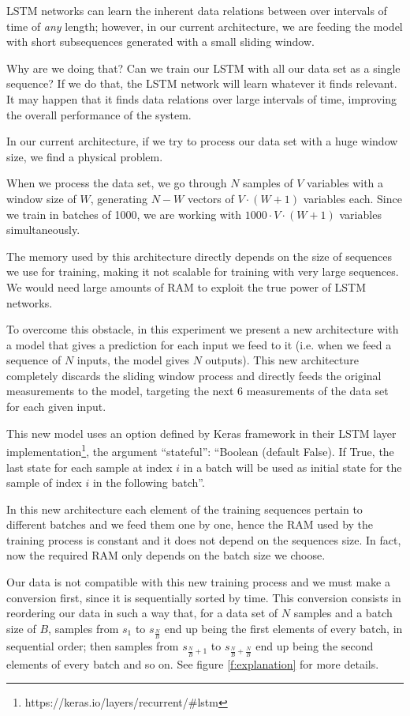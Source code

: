 \documentclass[]{article}
\begin{document}
LSTM networks can learn the inherent data relations between over intervals of time of \emph{any} length; however, in our current architecture, we are feeding the model with short subsequences generated with a small sliding window.

Why are we doing that? Can we train our LSTM with all our data set as a single sequence? If we do that, the LSTM network will learn whatever it finds relevant. It may happen that it finds data relations over large intervals of time, improving the overall performance of the system.

In our current architecture, if we try to process our data set with a huge window size, we find a physical problem.

When we process the data set, we go through $ N $ samples of $ V $ variables with a window size of $ W $, generating $ N - W $ vectors of $ V \cdot (W + 1) $ variables each. Since we train in batches of 1000, we are working with $ 1000 \cdot V \cdot (W + 1) $ variables simultaneously.

The memory used by this architecture directly depends on the size of sequences we use for training, making it not scalable for training with very large sequences. We would need large amounts of RAM to exploit the true power of LSTM networks.

To overcome this obstacle, in this experiment we present a new architecture with a model that gives a prediction for each input we feed to it (i.e. when we feed a sequence of $ N $ inputs, the model gives $ N $ outputs). This new architecture completely discards the sliding window process and directly feeds the original measurements to the model, targeting the next 6 measurements of the data set for each given input.

This new model uses an option defined by Keras framework in their LSTM layer implementation\footnote{https://keras.io/layers/recurrent/\#lstm}, the argument ``stateful'': ``Boolean (default False). If True, the last state for each sample at index $ i $ in a batch will be used as initial state for the sample of index $ i $ in the following batch''.

In this new architecture each element of the training sequences pertain to different batches and we feed them one by one, hence the RAM used by the training process is constant and it does not depend on the sequences size. In fact, now the required RAM only depends on the batch size we choose.

Our data is not compatible with this new training process and we must make a conversion first, since it is sequentially sorted by time. This conversion consists in reordering our data in such a way that, for a data set of $ N $ samples and a batch size of $ B $, samples from $ s_1 $ to $ s_{\frac{N}{B}} $ end up being the first elements of every batch, in sequential order; then samples from $ s_{\frac{N}{B}+1} $ to $ s_{\frac{N}{B}+\frac{N}{B}} $ end up being the second elements of every batch and so on. See figure \ref{f:explanation} for more details.
\end{document}
